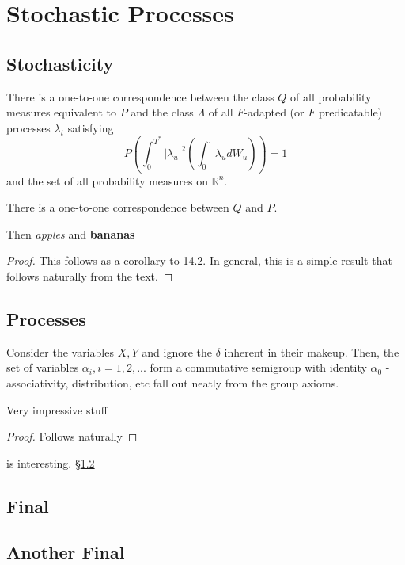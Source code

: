 \chapter{Stochastic Processes}

\section{Stochasticity}
\begin{defn}
  There is a one-to-one correspondence between the class $Q$ of all
  probability measures equivalent to $P$ and the class $\Lambda$ of
  all $F$-adapted (or $F$ predicatable) processes $\lambda_{t}$
  satisfying
  \begin{equation}
    P \left(\int_{0}^{T^{*}} |\lambda_{u}|^{2} \left(\int_{0}^{\cdot}
        \lambda_{u} dW_{u} \right) \right) = 1
  \end{equation}
  and the set of all probability measures on $\mathbb{R}^{n}$.
\end{defn}

\begin{thm}
  There is a one-to-one correspondence between $Q$ and $P$. 
\end{thm}

Then \emph{apples} and \textbf{bananas}

\begin{proof}
  This follows as a corollary to 14.2.  In general, this is a simple
  result that follows naturally from the text.
\end{proof}

\section{Processes}
\label{sec:processes}

Consider the variables $X, Y$ and ignore the $\delta$ inherent in
their makeup. Then, the set of variables $\alpha_{i}, i = 1, 2, ...$
form a commutative semigroup with identity $\alpha_{0}$ -
associativity, distribution, etc fall out neatly from the group
axioms.

\begin{defn}
  Very impressive stuff
\end{defn}

\begin{proof}
  Follows naturally
\end{proof}

\pageref{sec:processes} is interesting.  \S\ref{sec:processes}

\section{Final}
\label{sec:final}

\section{Another Final}
\label{sec:another-final}



